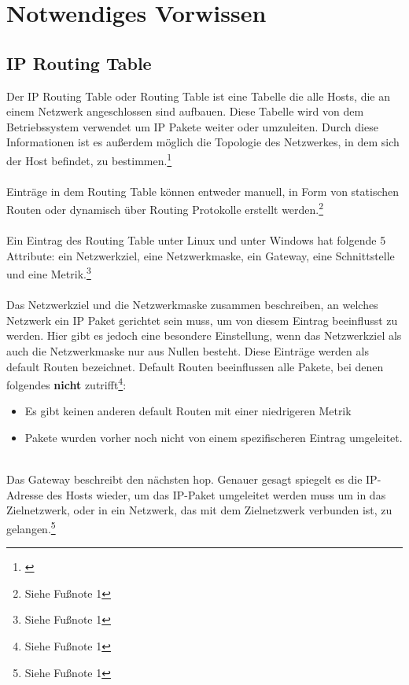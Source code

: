 \chapter{Notwendiges Vorwissen}
\label{cha:Notwendiges Vorwissen}

\section{IP Routing Table}
Der IP Routing Table oder Routing Table ist eine Tabelle die alle Hosts, die an einem Netzwerk angeschlossen sind aufbauen. Diese Tabelle wird von dem Betriebssystem verwendet um IP Pakete weiter oder umzuleiten. Durch diese Informationen ist es außerdem möglich die Topologie des Netzwerkes, in dem sich der Host befindet, zu bestimmen.\footnote[1]{\cite[Vgl.][]{2}}
\\\\
Einträge in dem Routing Table können entweder manuell, in Form von statischen Routen oder dynamisch über Routing Protokolle erstellt werden.\footnote[2]{Siehe Fußnote 1}
\\\\
Ein Eintrag des Routing Table unter Linux und unter Windows hat folgende 5 Attribute: ein Netzwerkziel, eine Netzwerkmaske, ein Gateway, eine Schnittstelle und eine Metrik.\footnote[3]{Siehe Fußnote 1}
\\\\
Das Netzwerkziel und die Netzwerkmaske zusammen beschreiben, an welches Netzwerk ein IP Paket gerichtet sein muss, um von diesem Eintrag beeinflusst zu werden. Hier gibt es jedoch eine besondere Einstellung, wenn das Netzwerkziel als auch die Netzwerkmaske nur aus Nullen besteht. Diese Einträge werden als default Routen bezeichnet. Default Routen beeinflussen alle Pakete, bei denen folgendes \textbf{nicht} zutrifft\footnote[4]{Siehe Fußnote 1}: 
\\
\begin{itemize}
    \item Es gibt keinen anderen default Routen mit einer niedrigeren Metrik
    \item Pakete wurden vorher noch nicht von einem spezifischeren Eintrag umgeleitet.
\end{itemize}
\ \\
Das Gateway beschreibt den nächsten hop. Genauer gesagt spiegelt es die IP-Adresse des Hosts wieder, um das IP-Paket umgeleitet werden muss um in das Zielnetzwerk, oder in ein Netzwerk, das mit dem Zielnetzwerk verbunden ist, zu gelangen.\footnote[5]{Siehe Fußnote 1}
